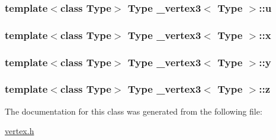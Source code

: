 \hypertarget{class__vertex3_aaf594fdee80ea52362480c9c5564421d}{
\subsubsection[{u}]{\setlength{\rightskip}{0pt plus 5cm}template$<$class Type$>$ Type {\bf \+\_\+vertex3}$<$ Type $>$\+::u}}\label{class__vertex3_aaf594fdee80ea52362480c9c5564421d}
\hypertarget{class__vertex3_a77ebded2a16c1bf9c5a49c430ed2cdd5}{
\subsubsection[{x}]{\setlength{\rightskip}{0pt plus 5cm}template$<$class Type$>$ Type {\bf \+\_\+vertex3}$<$ Type $>$\+::x}}\label{class__vertex3_a77ebded2a16c1bf9c5a49c430ed2cdd5}
\hypertarget{class__vertex3_abcd5c04cac02df4f40d5aa38f695bd84}{
\subsubsection[{y}]{\setlength{\rightskip}{0pt plus 5cm}template$<$class Type$>$ Type {\bf \+\_\+vertex3}$<$ Type $>$\+::y}}\label{class__vertex3_abcd5c04cac02df4f40d5aa38f695bd84}
\hypertarget{class__vertex3_a85e78a70c2a3ec213b5dfd688ea87041}{
\subsubsection[{z}]{\setlength{\rightskip}{0pt plus 5cm}template$<$class Type$>$ Type {\bf \+\_\+vertex3}$<$ Type $>$\+::z}}\label{class__vertex3_a85e78a70c2a3ec213b5dfd688ea87041}


The documentation for this class was generated from the following file\+:\begin{DoxyCompactItemize}
\item 
\hyperlink{vertex_8h}{vertex.\+h}\end{DoxyCompactItemize}
